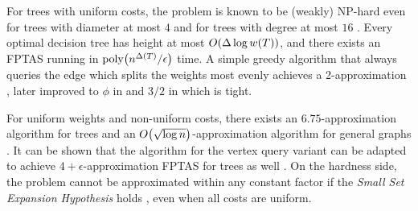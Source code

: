 For trees with uniform costs, the problem is known to be (weakly) NP-hard 
even for trees with diameter at most $4$ and for trees with degree at most $16$ 
\cite{Jacobs2010OnTheComplexSearchInTsAvg}. 
Every optimal decision tree has height at most $O\mathopen{}\left( \Delta \log w\mathopen{}\left( T \right) \right)$, and there exists 
an FPTAS running in $\text{poly}\mathopen{}\left( n^{\Delta\mathopen{}\left( T \right)}/\epsilon \right)$ time. 
A simple greedy algorithm that always queries the edge which splits the weights most evenly 
achieves a 2-approximation \cite{Jacobs2010OnTheComplexSearchInTsAvg}, later improved to $\phi$ in \cite{Cicalese2014ImprovedApproxAvgTs} and $3/2$ in 
\cite{Hgemo2024TightAB} which is tight. 

For uniform weights and non-uniform costs, there exists an $6.75$-approximation algorithm for trees 
and an $O\mathopen{}\left( \sqrt{\log n} \right)$-approximation algorithm for general graphs 
\cite{HCObjFsandAlgs,Approximatehierarchicalclusteringviasparsestcutandspreadingmetrics}. It can be shown that the algorithm for the vertex query variant can be adapted to achieve $4+\epsilon$-approximation FPTAS for trees as well \cite{szyfelbein2025approximatingaveragecasegraphsearch}.
On the hardness side, the problem cannot be approximated within any constant factor 
if the \textit{Small Set Expansion Hypothesis} holds 
\cite{Approximatehierarchicalclusteringviasparsestcutandspreadingmetrics}, even when all costs are uniform.